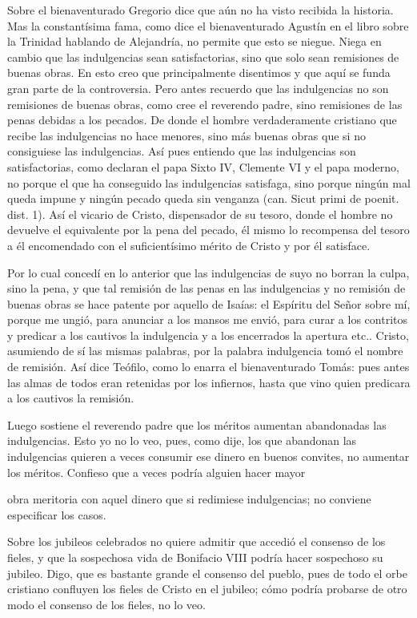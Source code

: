Sobre el bienaventurado Gregorio dice que aún no ha visto recibida la historia. Mas la constantísima fama, como dice el bienaventurado Agustín en el libro sobre la Trinidad hablando de Alejandría, no permite que esto se niegue. Niega en cambio que las indulgencias sean satisfactorias, sino que solo sean remisiones de buenas obras. En esto creo que principalmente disentimos y que aquí se funda gran parte de la controversia. Pero antes recuerdo que las indulgencias no son remisiones de buenas obras, como cree el reverendo padre, \marginpar{\small[352]} sino remisiones de las penas debidas a los pecados. De donde el hombre verdaderamente cristiano que recibe las indulgencias no hace menores, sino más buenas obras que si no consiguiese las indulgencias. Así pues entiendo que las indulgencias son satisfactorias, como declaran el papa Sixto IV, Clemente VI y el papa moderno, no porque el que ha conseguido las indulgencias satisfaga, sino porque ningún mal queda impune y ningún pecado queda sin venganza (can. Sicut primi de poenit. dist. 1). Así el vicario de Cristo, dispensador de su tesoro, donde el hombre no devuelve el equivalente por la pena del pecado, él mismo lo recompensa del tesoro a él encomendado con el suficientísimo mérito de Cristo y por él satisface.

Por lo cual concedí en lo anterior que las indulgencias de suyo no borran la culpa, sino la pena, y que tal remisión de las penas en las indulgencias y no remisión de buenas obras se hace patente por aquello de Isaías: el Espíritu del Señor sobre mí, porque me ungió, para anunciar a los mansos me envió, para curar a los contritos y predicar a los cautivos la indulgencia y a los encerrados la apertura etc.. Cristo, asumiendo de sí las mismas palabras, por la palabra indulgencia tomó el nombre de remisión. Así dice Teófilo, como lo enarra el bienaventurado Tomás: pues antes las almas de todos eran retenidas por los infiernos, hasta que vino quien predicara a los cautivos la remisión.

Luego sostiene el reverendo padre que los méritos aumentan abandonadas las indulgencias. Esto yo no lo veo, pues, como dije, los que abandonan las indulgencias quieren a veces consumir ese dinero en buenos convites, no aumentar los méritos. Confieso que a veces podría alguien hacer mayor

obra meritoria con aquel dinero que si redimiese indulgencias; no conviene especificar los casos.

Sobre los jubileos celebrados no quiere admitir que accedió el consenso de los fieles, y que la sospechosa vida de Bonifacio VIII podría hacer sospechoso su jubileo. Digo, que es bastante grande el consenso del pueblo, pues de todo el orbe cristiano confluyen los fieles de Cristo en el jubileo; cómo podría probarse de otro modo el consenso de los fieles, no lo veo.

